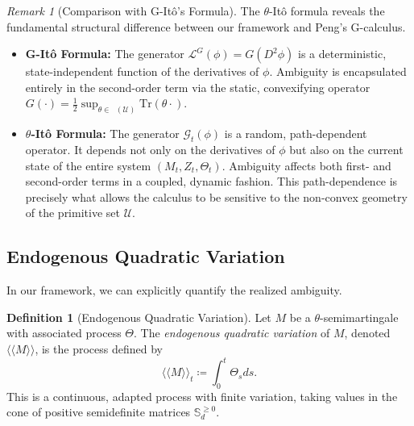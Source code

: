 \documentclass[12pt, letterpaper]{amsart}
\newcommand{\Ucal}{\mathcal{U}}
\newcommand{\Sdpn}{\mathbb{S}_d^{\ge 0}}
\newcommand{\Tr}{\mathrm{Tr}}
\DeclareMathOperator*{\overlineconv}{\overline{conv}}
\theoremstyle{plain}
\theoremstyle{definition}
\newtheorem{definition}[theorem]{Definition}
\theoremstyle{remark}
\newtheorem{remark}[theorem]{Remark}
\numberwithin{equation}{section} %
\begin{document}
\begin{remark}[Comparison with G-Itô's Formula]
The \(\theta\)-Itô formula reveals the fundamental structural difference between our framework and Peng's G-calculus.
\begin{itemize}
    \item \textbf{G-Itô Formula:} The generator \(\mathcal{L}^G(\phi) = G(D^2\phi)\) is a deterministic, state-independent function of the derivatives of \(\phi\). Ambiguity is encapsulated entirely in the second-order term via the static, convexifying operator $G(\cdot) = \frac{1}{2}\sup_{\theta \in \overlineconv(\Ucal)} \Tr(\theta \cdot)$.
    \item \textbf{$\theta$-Itô Formula:} The generator \(\mathcal{G}_t(\phi)\) is a random, path-dependent operator. It depends not only on the derivatives of \(\phi\) but also on the current state of the entire system \((M_t, Z_t, \Theta_t)\). Ambiguity affects both first- and second-order terms in a coupled, dynamic fashion. This path-dependence is precisely what allows the calculus to be sensitive to the non-convex geometry of the primitive set \(\Ucal\).
\end{itemize}
\end{remark}

\subsection{Endogenous Quadratic Variation}
In our framework, we can explicitly quantify the realized ambiguity.

\begin{definition}[Endogenous Quadratic Variation]
\label{def:endogenous_qv}
Let \(M\) be a \(\theta\)-semimartingale with associated process \(\Theta\). The \emph{endogenous quadratic variation} of \(M\), denoted \(\langle\langle M \rangle\rangle\), is the process defined by
\begin{equation}
    \langle\langle M \rangle\rangle_t \coloneqq \int_0^t \Theta_s ds.
\end{equation}
This is a continuous, adapted process with finite variation, taking values in the cone of positive semidefinite matrices \(\Sdpn\).
\end{definition}
\end{document}
